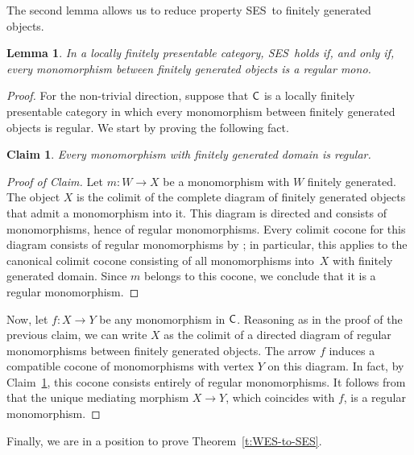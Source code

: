 \documentclass[a4paper,10pt,reqno]{amsart}
\newtheorem{lemma}[theorem]{Lemma}
\newtheorem{claim}[theorem]{Claim}
\theoremstyle{definition}
\theoremstyle{remark}
\newcommand{\cat}{{\sf C}}								%
\newcommand{\SES}{\textnormal{SES}}
\begin{document}
The second lemma allows us to reduce property \SES~to finitely generated objects.
%
\begin{lemma}\label{l:SES-to-finitely-generated-objects}
	In a locally finitely presentable category, \SES~holds if, and only if, every monomorphism between finitely generated objects is a regular mono.
	\end{lemma}

	\begin{proof}
	For the non-trivial direction, suppose that $\cat$ is a locally finitely presentable category in which every monomorphism between finitely generated objects is regular. We start by proving the following fact.

	\begin{claim}\label{claim:fg-mono-reg}
	Every monomorphism with finitely generated domain is regular.
	\end{claim}
	\begin{proof}[Proof of Claim]
	Let $m\colon W\to X$ be a monomorphism with $W$ finitely generated. The object $X$ is the colimit of the complete diagram of finitely generated objects that admit a monomorphism into it. This diagram is directed and consists of monomorphisms, hence of regular monomorphisms. Every colimit cocone for this diagram consists of regular monomorphisms by \cite[Proposition~1.62(i)]{ar94book}; in particular, this applies to the canonical colimit cocone consisting of all monomorphisms into~$X$ with finitely generated domain. Since $m$ belongs to this cocone, we conclude that it is a regular monomorphism.
	\end{proof}
	
	Now, let $f\colon X\to Y$ be any monomorphism in $\cat$. Reasoning as in the proof of the previous claim, we can write $X$ as the colimit of a directed diagram of regular monomorphisms between finitely generated objects. The arrow $f$ induces a compatible cocone of monomorphisms with vertex $Y$ on this diagram. In fact, by Claim~\ref{claim:fg-mono-reg}, this cocone consists entirely of regular monomorphisms.  It follows from \cite[Proposition~1.62(ii)]{ar94book} that the unique mediating morphism $X\to Y$, which coincides with $f$, is a regular monomorphism.
	\end{proof}

Finally, we are in a position to prove Theorem~\ref{t:WES-to-SES}.
\end{document}
